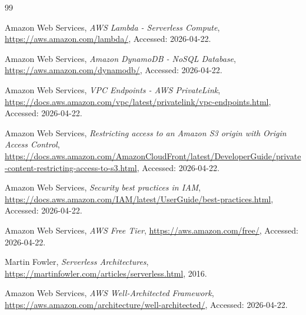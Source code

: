 \begin{thebibliography}{99}

Amazon Web Services,
\textit{AWS Lambda - Serverless Compute},
\url{https://aws.amazon.com/lambda/},
Accessed: 2026-04-22.

Amazon Web Services,
\textit{Amazon DynamoDB - NoSQL Database},
\url{https://aws.amazon.com/dynamodb/},
Accessed: 2026-04-22.

Amazon Web Services,
\textit{VPC Endpoints - AWS PrivateLink},
\url{https://docs.aws.amazon.com/vpc/latest/privatelink/vpc-endpoints.html},
Accessed: 2026-04-22.

Amazon Web Services,
\textit{Restricting access to an Amazon S3 origin with Origin Access Control},
\url{https://docs.aws.amazon.com/AmazonCloudFront/latest/DeveloperGuide/private-content-restricting-access-to-s3.html},
Accessed: 2026-04-22.

Amazon Web Services,
\textit{Security best practices in IAM},
\url{https://docs.aws.amazon.com/IAM/latest/UserGuide/best-practices.html},
Accessed: 2026-04-22.

Amazon Web Services,
\textit{AWS Free Tier},
\url{https://aws.amazon.com/free/},
Accessed: 2026-04-22.

Martin Fowler,
\textit{Serverless Architectures},
\url{https://martinfowler.com/articles/serverless.html},
2016.

Amazon Web Services,
\textit{AWS Well-Architected Framework},
\url{https://aws.amazon.com/architecture/well-architected/},
Accessed: 2026-04-22.

\end{thebibliography}
